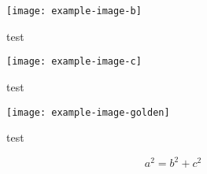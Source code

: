 \documentclass[polyglossia,a4paper,12pt,kosection]{oblivoir}
\begin{document}
  \begin{figure}
 \centering
 \texttt{[image: example-image-b]}
  \caption{test}\label{fig:test2}
 \end{figure}

  \begin{figure}
 \centering
 \texttt{[image: example-image-c]}
  \caption{test}\label{fig:test3}
 \end{figure}

  \setcounter{figure}{28}

  \begin{figure}
 \centering
 \texttt{[image: example-image-golden]}
  \caption{test}\label{fig:test4}
 \end{figure}

\setcounter{equation}{2}
\begin{equation}
a^2 = b^2 + c^2 \label{eq:3}
\end{equation}
\end{document}
